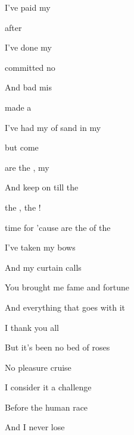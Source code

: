 

\zs
I've paid my 

 after 

I've done my 

 committed no  

And bad mis

 made a  

I've had my  of sand  in my 

but  come  
\ks

\zr
{} are the , my   

And  keep on  till the  

 the ,  the !

 time for  'cause  are the  of the  
\kr

\zs
I've taken my bows

And my curtain calls

You brought me fame and fortune

And everything that goes with it

I thank you all

But it's been no bed of roses

No pleasure cruise

I consider it a challenge

Before the human race

And I never lose
\ks

\zr  \kr

\kp






















